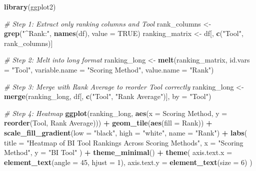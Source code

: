 \documentclass[
]{article}
\newenvironment{Shaded}{\begin{snugshade}}{\end{snugshade}}
\newcommand{\AttributeTok}[1]{\textcolor[rgb]{0.13,0.29,0.53}{#1}}
\newcommand{\CommentTok}[1]{\textcolor[rgb]{0.56,0.35,0.01}{\textit{#1}}}
\newcommand{\ConstantTok}[1]{\textcolor[rgb]{0.56,0.35,0.01}{#1}}
\newcommand{\DecValTok}[1]{\textcolor[rgb]{0.00,0.00,0.81}{#1}}
\newcommand{\FunctionTok}[1]{\textcolor[rgb]{0.13,0.29,0.53}{\textbf{#1}}}
\newcommand{\NormalTok}[1]{#1}
\newcommand{\OtherTok}[1]{\textcolor[rgb]{0.56,0.35,0.01}{#1}}
\newcommand{\SpecialCharTok}[1]{\textcolor[rgb]{0.81,0.36,0.00}{\textbf{#1}}}
\newcommand{\StringTok}[1]{\textcolor[rgb]{0.31,0.60,0.02}{#1}}
\begin{document}
\begin{Shaded}
\begin{Highlighting}[]
\FunctionTok{library}\NormalTok{(ggplot2)}

\CommentTok{\# Step 1: Extract only ranking columns and Tool}
\NormalTok{rank\_columns }\OtherTok{\textless{}{-}} \FunctionTok{grep}\NormalTok{(}\StringTok{"\^{}Rank:"}\NormalTok{, }\FunctionTok{names}\NormalTok{(df), }\AttributeTok{value =} \ConstantTok{TRUE}\NormalTok{)}
\NormalTok{ranking\_matrix }\OtherTok{\textless{}{-}}\NormalTok{ df[, }\FunctionTok{c}\NormalTok{(}\StringTok{"Tool"}\NormalTok{, rank\_columns)]}

\CommentTok{\# Step 2: Melt into long format}
\NormalTok{ranking\_long }\OtherTok{\textless{}{-}} \FunctionTok{melt}\NormalTok{(ranking\_matrix, }\AttributeTok{id.vars =} \StringTok{"Tool"}\NormalTok{, }\AttributeTok{variable.name =} \StringTok{"Scoring Method"}\NormalTok{, }\AttributeTok{value.name =} \StringTok{"Rank"}\NormalTok{)}

\CommentTok{\# Step 3: Merge with Rank Average to reorder Tool correctly}
\NormalTok{ranking\_long }\OtherTok{\textless{}{-}} \FunctionTok{merge}\NormalTok{(ranking\_long, df[, }\FunctionTok{c}\NormalTok{(}\StringTok{"Tool"}\NormalTok{, }\StringTok{"Rank Average"}\NormalTok{)], }\AttributeTok{by =} \StringTok{"Tool"}\NormalTok{)}

\CommentTok{\# Step 4: Heatmap}
\FunctionTok{ggplot}\NormalTok{(ranking\_long, }\FunctionTok{aes}\NormalTok{(}\AttributeTok{x =} \StringTok{\textasciigrave{}}\AttributeTok{Scoring Method}\StringTok{\textasciigrave{}}\NormalTok{, }\AttributeTok{y =} \FunctionTok{reorder}\NormalTok{(Tool, }\StringTok{\textasciigrave{}}\AttributeTok{Rank Average}\StringTok{\textasciigrave{}}\NormalTok{))) }\SpecialCharTok{+}
  \FunctionTok{geom\_tile}\NormalTok{(}\FunctionTok{aes}\NormalTok{(}\AttributeTok{fill =}\NormalTok{ Rank)) }\SpecialCharTok{+}
  \FunctionTok{scale\_fill\_gradient}\NormalTok{(}\AttributeTok{low =} \StringTok{"black"}\NormalTok{, }\AttributeTok{high =} \StringTok{"white"}\NormalTok{, }\AttributeTok{name =} \StringTok{"Rank"}\NormalTok{) }\SpecialCharTok{+}
  \FunctionTok{labs}\NormalTok{(}
    \AttributeTok{title =} \StringTok{"Heatmap of BI Tool Rankings Across Scoring Methods"}\NormalTok{,}
    \AttributeTok{x =} \StringTok{"Scoring Method"}\NormalTok{,}
    \AttributeTok{y =} \StringTok{"BI Tool"}
\NormalTok{  ) }\SpecialCharTok{+}
  \FunctionTok{theme\_minimal}\NormalTok{() }\SpecialCharTok{+}
  \FunctionTok{theme}\NormalTok{(}
    \AttributeTok{axis.text.x =} \FunctionTok{element\_text}\NormalTok{(}\AttributeTok{angle =} \DecValTok{45}\NormalTok{, }\AttributeTok{hjust =} \DecValTok{1}\NormalTok{),}
    \AttributeTok{axis.text.y =} \FunctionTok{element\_text}\NormalTok{(}\AttributeTok{size =} \DecValTok{6}\NormalTok{)}
\NormalTok{  )}
\end{Highlighting}
\end{Shaded}
\end{document}
